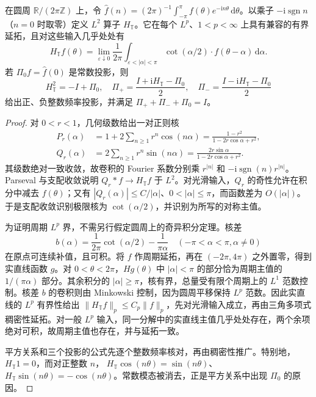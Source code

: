 \begin{proposition}[周期共轭算子]\label{b2:prop:18-periodic-hilbert}
在圆周 \(\mathbb R/(2\pi\mathbb Z)\) 上，令
\(\widehat f(n)=(2\pi)^{-1}\int_{-\pi}^\pi f(\theta)e^{-\mathrm in\theta}\,\mathrm d\theta\)。以乘子 \(-\mathrm i\operatorname{sgn}n\)（\(n=0\) 时取零）定义 \(L^2\) 算子 \(H_{\mathbb T}\)。它在每个 \(L^p\)、\(1<p<\infty\) 上具有兼容的有界延拓，且对这些输入几乎处处有
\[
 H_{\mathbb T}f(\theta)=\lim_{\varepsilon\downarrow0}
 \frac1{2\pi}\int_{\varepsilon<|\alpha|<\pi}
 \cot(\alpha/2)\cdot f(\theta-\alpha)\,\mathrm d\alpha.
\]
若 \(\Pi_0f=\widehat f(0)\) 是常数投影，则
\[
 H_{\mathbb T}^2=-I+\Pi_0,
 \quad
 \Pi_+=\frac{I+\mathrm iH_{\mathbb T}-\Pi_0}{2},
 \quad
 \Pi_-=\frac{I-\mathrm iH_{\mathbb T}-\Pi_0}{2}
\]
给出正、负整数频率投影，并满足 \(\Pi_++\Pi_-+\Pi_0=I\)。
\end{proposition}
\begin{proof}
对 \(0<r<1\)，几何级数给出一对正则核
\[
 \begin{aligned}
 P_r(\alpha)&=1+2\sum_{n\geq1}r^n\cos(n\alpha)
 =\frac{1-r^2}{1-2r\cos\alpha+r^2},\\
 Q_r(\alpha)&=2\sum_{n\geq1}r^n\sin(n\alpha)
 =\frac{2r\sin\alpha}{1-2r\cos\alpha+r^2}.
 \end{aligned}
\]
其级数绝对一致收敛，故卷积的 Fourier 系数分别乘 \(r^{|n|}\) 和 \(-\mathrm i\operatorname{sgn}(n)r^{|n|}\)。Parseval 与支配收敛说明 \(Q_r*f\rightarrow H_{\mathbb T}f\) 于 \(L^2\)。对光滑输入，\(Q_r\) 的奇性允许在积分中减去 \(f(\theta)\)；又有 \(|Q_r(\alpha)|\leq C/|\alpha|\)、\(0<|\alpha|\leq\pi\)，而函数差为 \(O(|\alpha|)\)。于是支配收敛识别极限核为 \(\cot(\alpha/2)\)，并识别为所写的对称主值。

为证明周期 \(L^p\) 界，不需另行假定圆周上的奇异积分定理。核差
\[
 b(\alpha)=\frac1{2\pi}\cot(\alpha/2)-\frac1{\pi\alpha}
 \quad(-\pi<\alpha<\pi, \alpha\ne0)
\]
在原点可连续补值，且可积。将 \(f\) 作周期延拓，再在 \((-2\pi,4\pi)\) 之外置零，得到实直线函数 \(g\)。对 \(0<\theta<2\pi\)，\(Hg(\theta)\) 中 \(|\alpha|<\pi\) 的部分恰为周期主值的 \(1/(\pi\alpha)\) 部分。其余积分的 \(|\alpha|\geq\pi\)，核有界，总量受有限个周期上的 \(L^1\) 范数控制。核差 \(b\) 的卷积则由 Minkowski 控制，因为圆周平移保持 \(L^p\) 范数。因此实直线的 \(L^p\) 有界性给出
\(\|H_{\mathbb T}f\|_p\leq C_p\|f\|_p\)，先对光滑输入成立，再由三角多项式稠密性延拓。对一般 \(L^p\) 输入，同一分解中的实直线主值几乎处处存在，两个余项绝对可积，故周期主值也存在，并与延拓一致。

平方关系和三个投影的公式先逐个整数频率核对，再由稠密性推广。特别地，\(H_{\mathbb T}1=0\)，而对正整数 \(n\)，
\(H_{\mathbb T}\cos(n\theta)=\sin(n\theta)\)、\(H_{\mathbb T}\sin(n\theta)=-\cos(n\theta)\)。常数模态被消去，正是平方关系中出现 \(\Pi_0\) 的原因。
\end{proof}

